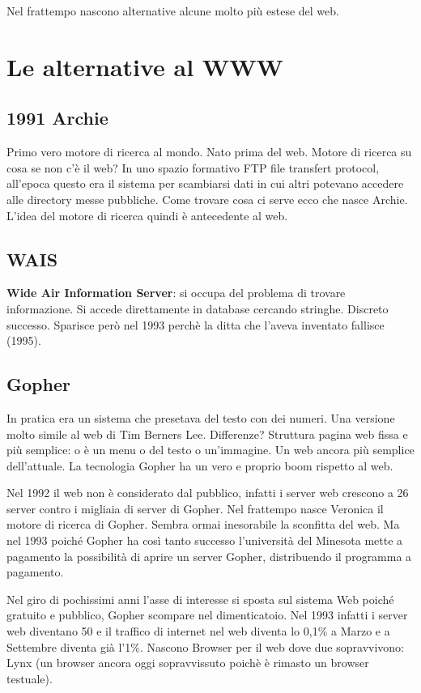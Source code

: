		Nel frattempo nascono alternative alcune molto più estese del web.	
		
		
	\section{Le alternative al WWW}
	
		\subsection{1991 Archie}
		Primo vero motore di ricerca al mondo. Nato prima del web. Motore di ricerca su cosa se non c'è il web? In uno spazio formativo FTP file transfert protocol, all'epoca questo era il sistema per scambiarsi dati in cui altri potevano accedere alle directory messe pubbliche. Come trovare cosa ci serve ecco che nasce Archie. L'idea del motore di ricerca quindi è antecedente al web.
		
		\subsection{WAIS}
		\textbf{Wide Air Information Server}: si occupa del problema di trovare informazione. Si accede direttamente in database cercando stringhe. Discreto successo.
		Sparisce però nel 1993 perchè la ditta che l'aveva inventato fallisce (1995).
		
		\subsection{Gopher}
		In pratica era un sistema che presetava del testo con dei numeri. Una versione molto simile al web di Tim Berners Lee. Differenze? Struttura pagina web fissa e più semplice: o è un menu o del testo o un'immagine. Un web ancora più semplice dell'attuale. La tecnologia Gopher ha un vero e proprio boom rispetto al web.
		
		Nel 1992 il web non è considerato dal pubblico, infatti i server web crescono a 26 server contro i migliaia di server di Gopher.
		Nel frattempo nasce Veronica il motore di ricerca di Gopher. Sembra ormai inesorabile la sconfitta del web. Ma nel 1993 poiché Gopher ha così tanto successo l'università del Minesota mette a pagamento la possibilità di aprire un server Gopher, distribuendo il programma a pagamento. 
		
		Nel giro di pochissimi anni l'asse di interesse si sposta sul sistema Web poiché gratuito e pubblico, Gopher scompare nel dimenticatoio.
		Nel 1993 infatti i server web diventano 50 e il traffico di internet nel web diventa lo 0,1\% a Marzo e a Settembre diventa già l'1\%.
		Nascono Browser per il web dove due sopravvivono: Lynx (un browser ancora oggi sopravvissuto poichè è rimasto un browser testuale).
		
